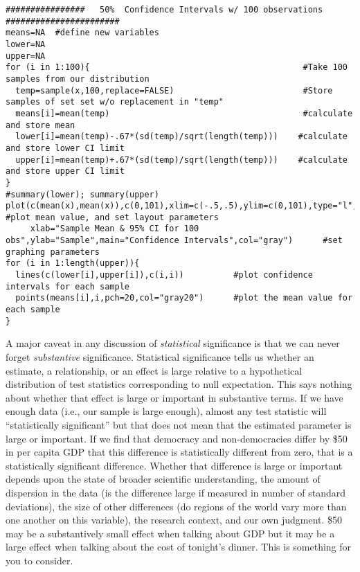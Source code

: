 \documentclass[a4paper,12pt]{article}
\begin{document}
\begin{enumerate*}
\begin{verbatim}
################   50%  Confidence Intervals w/ 100 observations #######################
means=NA  #define new variables
lower=NA  
upper=NA                       
for (i in 1:100){                                           #Take 100 samples from our distribution
  temp=sample(x,100,replace=FALSE)                          #Store samples of set set w/o replacement in "temp"
  means[i]=mean(temp)                                       #calculate and store mean
  lower[i]=mean(temp)-.67*(sd(temp)/sqrt(length(temp)))    #calculate and store lower CI limit
  upper[i]=mean(temp)+.67*(sd(temp)/sqrt(length(temp)))    #calculate and store upper CI limit
}
#summary(lower); summary(upper)
plot(c(mean(x),mean(x)),c(0,101),xlim=c(-.5,.5),ylim=c(0,101),type="l",      #plot mean value, and set layout parameters
     xlab="Sample Mean & 95% CI for 100 obs",ylab="Sample",main="Confidence Intervals",col="gray")      #set graphing parameters
for (i in 1:length(upper)){                   
  lines(c(lower[i],upper[i]),c(i,i))          #plot confidence intervals for each sample
  points(means[i],i,pch=20,col="gray20")      #plot the mean value for each sample
}
\end{verbatim}












\item A major caveat in any discussion of \textit{statistical} significance is that we can never forget \textit{substantive} significance. Statistical significance tells us whether an estimate, a relationship, or an effect is large relative to a hypothetical distribution of test statistics corresponding to null expectation. This says nothing about whether that effect is large or important in substantive terms. If we have enough data (i.e., our sample is large enough), almost any test statistic will ``statistically significant'' but that does not mean that the estimated parameter is large or important. If we find that democracy and non-democracies differ by \$50 in per capita GDP that this difference is statistically different from zero, that is a statistically significant difference. Whether that difference is large or important depends upon the state of broader scientific understanding, the amount of dispersion in the data (is the difference large if measured in number of standard deviations), the size of other differences (do regions of the world vary more than one another on this variable), the research context, and our own judgment. \$50 may be a substantively small effect when talking about GDP but it may be a large effect when talking about the cost of tonight's dinner. This is something for you to consider.


\end{enumerate*}
\end{document}
